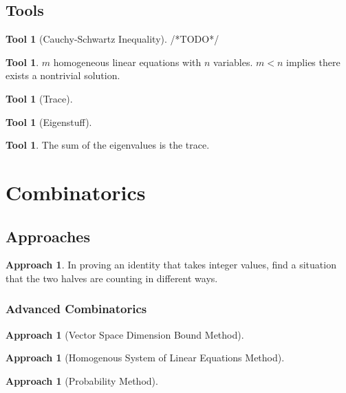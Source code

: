 \documentclass[12pt]{amsart}
\theoremstyle{definition}
\newtheorem{tool}[theorem]{Tool}
\newtheorem{approach}[theorem]{Approach}
\begin{document}
\subsection{Tools}
\begin{tool}[Cauchy-Schwartz Inequality] /*TODO*/ \end{tool}
\begin{tool}
    $m$ homogeneous linear equations with $n$ variables. $m < n$ implies
    there exists a nontrivial solution.
\end{tool}
\begin{tool}[Trace]
\end{tool}
\begin{tool}[Eigenstuff]
\end{tool}
\begin{tool}
The sum of the eigenvalues is the trace.
\end{tool}
\section{Combinatorics}
\subsection{Approaches}
\begin{approach}
    In proving an identity that takes integer values, find a situation that
    the two halves are counting in different ways.
\end{approach}
\subsubsection{Advanced Combinatorics}
\begin{approach}[Vector Space Dimension Bound Method]
\end{approach}
\begin{approach}[Homogenous System of Linear Equations Method]
\end{approach}
\begin{approach}[Probability Method]
\end{approach}
\end{document}
